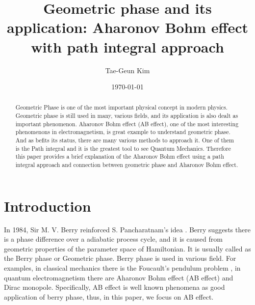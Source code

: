 \documentclass[%
 reprint,
 amsmath,amssymb,
 aps,
]{revtex4-1}
\begin{document}

\title{Geometric phase and its application: Aharonov Bohm effect\\
with path integral approach }%

\author{Tae-Geun Kim}
%

\date{\today}%

\begin{abstract}
Geometric Phase is one of the most important physical concept in modern physics. Geometric phase is still used in many, various fields, and its application is also dealt as important phenomenon. Aharonov Bohm effect (AB effect), one of the most interesting phenomenons in electromagnetism, is great example to understand geometric phase. And as befits its status, there are many various methods to approach it. One of them is the Path integral and it is the greatest tool to see Quantum Mechanics. Therefore this paper provides a brief explanation of the Aharonov Bohm effect using a path integral approach and connection between geometric phase and Aharonov Bohm effect.

\end{abstract}

\maketitle


\section{\label{sec:level1}Introduction}

In 1984, Sir M. V. Berry reinforced S. Pancharatnam's idea \cite{Berry, Pancharatnam}. Berry suggests there is a phase difference over a adiabatic process cycle, and it is caused from geometric properties of the parameter space of Hamiltonian. It is usually called as the Berry phase or Geometric phase. Berry phase is used in various field. For examples, in classical mechanics there is the Foucault's pendulum problem \cite{Foucault}, in quantum electromagnetism there are Aharonov Bohm effect (AB effect) and Dirac monopole. Specifically, AB effect is well known phenomena as good application of berry phase, thus, in this paper, we focus on AB effect.
\end{document}
